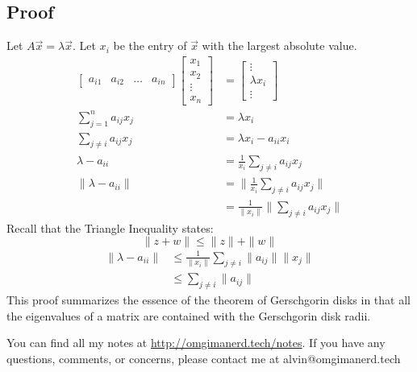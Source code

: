 \documentclass{math}
\begin{document}
\subsection*{Proof}
Let \( A\vec{x} = \lambda\vec{x} \). Let \( x_i \) be the entry of \( \vec{x} \)
with the largest absolute value.
\begin{align*}
  \begin{bmatrix}a_{i1} & a_{i2} & \dots & a_{in}\end{bmatrix}
  \begin{bmatrix}x_1 \\ x_2 \\ \vdots \\ x_n\end{bmatrix} &= \begin{bmatrix}
    \vdots \\ \lambda x_i \\ \vdots
  \end{bmatrix} \\
  \sum_{j=1}^na_{ij}x_j &= \lambda x_i \\
  \sum_{j\ne i}a_{ij}x_j &= \lambda x_i-a_{ii}x_i \\
  \lambda-a_{ii} &= \frac{1}{x_i}\sum_{j\ne i}a_{ij}x_j \\
  \|\lambda-a_{ii}\| &= \|\frac{1}{x_i}\sum_{j\ne i}a_{ij}x_j\| \\
  &= \frac{1}{\|x_i\|}\|\sum_{j\ne i}a_{ij}x_j\|
\end{align*}
Recall that the Triangle Inequality states:
\[ \|z+w\| \le \|z\|+\|w\| \]
\begin{align*}
  \|\lambda-a_{ii}\| &\le \frac{1}{\|x_i\|}\sum_{j\ne i}\|a_{ij}\|\|x_j\| \\
  &\le \sum_{j\ne i}\|a_{ij}\|
\end{align*}
This proof summarizes the essence of the theorem of Gerschgorin disks in that
all the eigenvalues of a matrix are contained with the Gerschgorin disk radii.

\begin{center}
  You can find all my notes at \url{http://omgimanerd.tech/notes}. If you have
  any questions, comments, or concerns, please contact me at
  alvin@omgimanerd.tech
\end{center}
\end{document}
